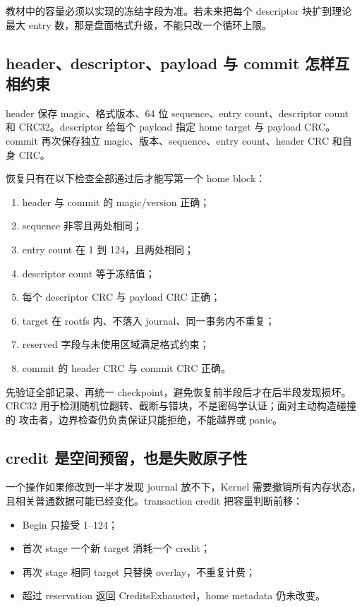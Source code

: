 \begin{contractbox}
教材中的容量必须以实现的冻结字段为准。若未来把每个 descriptor 块扩到理论
最大 entry 数，那是盘面格式升级，不能只改一个循环上限。
\end{contractbox}

\subsection{header、descriptor、payload 与 commit 怎样互相约束}

header 保存 magic、格式版本、64 位 sequence、entry count、descriptor count
和 CRC32。descriptor 给每个 payload 指定 home target 与 payload CRC。commit
再次保存独立 magic、版本、sequence、entry count、header CRC 和自身 CRC。

恢复只有在以下检查全部通过后才能写第一个 home block：

\begin{enumerate}
  \item header 与 commit 的 magic/version 正确；
  \item sequence 非零且两处相同；
  \item entry count 在 1 到 124，且两处相同；
  \item descriptor count 等于冻结值；
  \item 每个 descriptor CRC 与 payload CRC 正确；
  \item target 在 rootfs 内、不落入 journal、同一事务内不重复；
  \item reserved 字段与未使用区域满足格式约束；
  \item commit 的 header CRC 与 commit CRC 正确。
\end{enumerate}

先验证全部记录、再统一 checkpoint，避免恢复前半段后才在后半段发现损坏。
CRC32 用于检测随机位翻转、截断与错块，不是密码学认证；面对主动构造碰撞的
攻击者，边界检查仍负责保证只能拒绝，不能越界或 panic。

\subsection{credit 是空间预留，也是失败原子性}

一个操作如果修改到一半才发现 journal 放不下，Kernel 需要撤销所有内存状态，
且相关普通数据可能已经变化。transaction credit 把容量判断前移：

\begin{itemize}
  \item Begin 只接受 1--124；
  \item 首次 stage 一个新 target 消耗一个 credit；
  \item 再次 stage 相同 target 只替换 overlay，不重复计费；
  \item 超过 reservation 返回 CreditsExhausted，home metadata 仍未改变。
\end{itemize}


